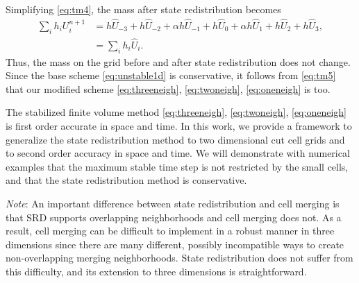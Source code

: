Simplifying \eqref{eq:tm4}, the mass after state redistribution becomes
\begin{equation}\label{eq:tm5}
\begin{aligned}
\sum_{i} h_i U^{n+1}_i  &= h \widehat{U}_{-3} + h \widehat{U}_{-2} + \alpha h \widehat{U}_{-1} +h \widehat{U}_0+\alpha h \widehat{U}_{1} + h \widehat{U}_{2} + h \widehat{U}_{3},\\
&= \sum_{i} h_i \widehat{U}_i.
\end{aligned}
\end{equation}
Thus, the mass on the grid before and after state redistribution does not change.
Since the base scheme \eqref{eq:unstable1d} is conservative, it follows from
\eqref{eq:tm5} that our modified scheme \eqref{eq:threeneigh},
\eqref{eq:twoneigh}, \eqref{eq:oneneigh} is too.




The stabilized finite volume method \eqref{eq:threeneigh},
\eqref{eq:twoneigh}, \eqref{eq:oneneigh} is first order accurate in space
and time.  In this work, we provide a framework to generalize the state
redistribution method to two dimensional cut cell grids and to 
second order accuracy in space and time.
We will demonstrate with numerical examples that the maximum stable time step is 
not restricted by the small cells, and that the state redistribution method 
is conservative.




\textit{Note}: An important difference between state redistribution and cell merging is that SRD
supports overlapping neighborhoods and cell merging does not. 
As a result, cell merging can be difficult to implement in a robust manner in three dimensions since there are many different, possibly incompatible ways to create non-overlapping merging neighborhoods.
State redistribution does not suffer from this difficulty, and its extension to three dimensions is straightforward.






